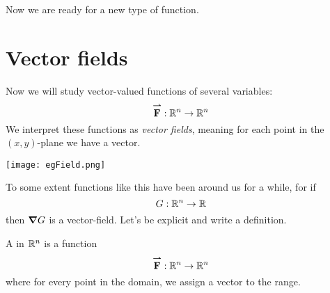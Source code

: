 \documentclass{ximera}
\begin{document}
Now we are ready for a new type of function.

\section{Vector fields}


Now we will study vector-valued functions of several variables:
\[
{\overset{\boldsymbol{\rightharpoonup}}{\mathbf{F}}}\hspace{0in}:\mathbb R^n\to \mathbb R^n
\]
We interpret these functions as \textit{vector fields}, meaning for
each point in the $(x,y)$-plane we have a vector.
\begin{image}
  \texttt{[image: egField.png]}
\end{image}
To some extent functions like this have been around us for a while,
for if
\[
G:\mathbb R^n\to\mathbb R
\]
then $\boldsymbol\nabla G$ is a vector-field.  Let's be explicit and write a definition.
\begin{definition}
  A  in $\mathbb R^n$ is a function
  \[
  {\overset{\boldsymbol{\rightharpoonup}}{\mathbf{F}}}\hspace{0in}: \mathbb R^n\to\mathbb R^n
  \]
  where for every point in the domain, we assign a vector to the range.
\end{definition}
\end{document}
